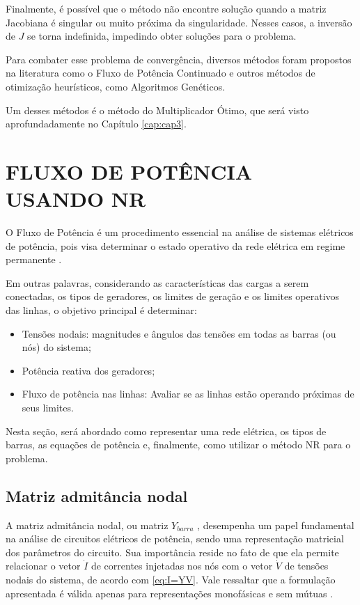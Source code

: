 Finalmente, é possível que o método não encontre solução quando a matriz Jacobiana é singular ou muito próxima da singularidade. Nesses casos, a inversão de $J$ se torna indefinida, impedindo obter soluções para o problema.

Para combater esse problema de convergência, diversos métodos foram propostos na literatura como o Fluxo de Potência Continuado e outros métodos de otimização heurísticos, como Algoritmos Genéticos.

Um desses métodos é o método do Multiplicador Ótimo, que será visto aprofundadamente no Capítulo \ref{cap:cap3}.

\section{FLUXO DE POTÊNCIA USANDO NR}
O Fluxo de Potência é um procedimento essencial na análise de sistemas elétricos de potência, pois visa determinar o estado operativo da rede elétrica em regime permanente \cite{ONSsubmodulo2_3}. 

Em outras palavras, considerando as características das cargas a serem conectadas, os tipos de geradores, os limites de geração e os limites operativos das linhas, o objetivo principal é determinar:
\begin{itemize}
    \item Tensões nodais: magnitudes e ângulos das tensões em todas as barras (ou nós) do sistema;
    \item Potência reativa dos geradores;
    \item Fluxo de potência nas linhas: Avaliar se as linhas estão operando próximas de seus limites.
\end{itemize}

Nesta seção, será abordado como representar uma rede elétrica, os tipos de barras, as equações de potência e, finalmente, como utilizar o método NR para o problema.


\subsection{Matriz admitância nodal}
A matriz admitância nodal, ou matriz 
$Y_{barra}$
, desempenha um papel fundamental na análise de circuitos elétricos de potência, sendo uma representação matricial dos parâmetros do circuito. Sua importância reside no fato de que ela permite relacionar o vetor
$\Dot I$
de correntes injetadas nos nós
com o vetor
$\Dot V$
de tensões nodais do sistema, de acordo com \eqref{eq:I=YV}. Vale ressaltar que a formulação apresentada é válida apenas para representações monofásicas e sem mútuas \cite{Robba}.

